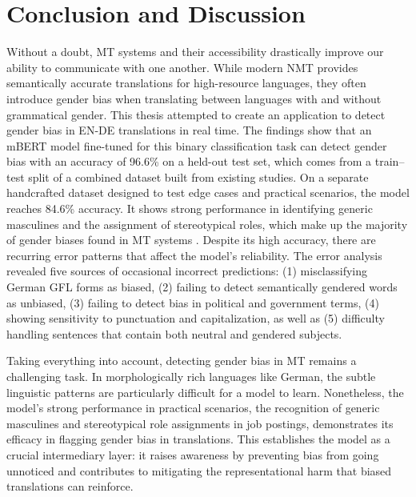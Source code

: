 \chapter{Conclusion and Discussion}
   Without a doubt, MT systems and their accessibility drastically improve our ability to communicate with one another. While modern NMT provides semantically accurate translations for high-resource languages, they often introduce gender bias when translating between languages with and without grammatical gender. This thesis attempted to create an application to detect gender bias in EN-DE translations in real time. The findings show that an mBERT model fine-tuned for this binary classification task can detect gender bias with an accuracy of 96.6\% on a held-out test set, which comes from a train–test split of a combined dataset built from existing studies. On a separate handcrafted dataset designed to test edge cases and practical scenarios, the model reaches 84.6\% accuracy. It shows strong performance in identifying generic masculines and the assignment of stereotypical roles, which make up the majority of gender biases found in MT systems \parencite{lardelliBuildingBridgesDataset2024,stanovskyEvaluatingGenderBias2019,pratesAssessingGenderBias2019}. Despite its high accuracy, there are recurring error patterns that affect the model’s reliability. The error analysis revealed five sources of occasional incorrect predictions: (1) misclassifying German GFL forms as biased, (2) failing to detect semantically gendered words as unbiased, (3) failing to detect bias in political and government terms, (4) showing sensitivity to punctuation and capitalization, as well as (5) difficulty handling sentences that contain both neutral and gendered subjects.

   Taking everything into account, detecting gender bias in MT remains a challenging task. In morphologically rich languages like German, the subtle linguistic patterns are particularly difficult for a model to learn. Nonetheless, the model's strong performance in practical scenarios, the recognition of generic masculines and stereotypical role assignments in job postings, demonstrates its efficacy in flagging gender bias in translations. This establishes the model as a crucial intermediary layer: it raises awareness by preventing bias from going unnoticed and contributes to mitigating the representational harm that biased translations can reinforce.

